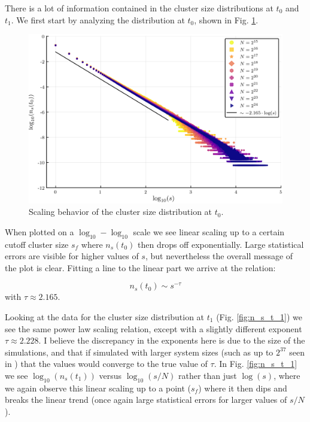There is a lot of information contained in the cluster size distributions at $t_0$ and $t_1$.
We first start by analyzing the distribution at $t_0$, shown in Fig. \ref{fig:n_s_t_0}.

\begin{figure}[H]
	\centering
	\includegraphics[width=350pt, clip]{images/n_s_t_0.png}
	\caption{Scaling behavior of the cluster size distribution at $t_0$.}
	\label{fig:n_s_t_0}
\end{figure}
When plotted on a $\log_{10}-\log_{10}$ scale we see linear scaling up to a certain cutoff cluster size $s_f$ where $n_s(t_0)$ then drops off exponentially.
Large statistical errors are visible for higher values of $s$, but nevertheless the overall message of the plot is clear.
Fitting a line to the linear part we arrive at the relation:

\begin{equation}
	n_s(t_0) \sim s^{-\tau}
\end{equation}
with $\tau \approx 2.165$.

Looking at the data for the cluster size distribution at $t_1$ (Fig. \ref{fig:n_s_t_1}) we see the same power law scaling relation, except with a slightly different exponent $\tau \approx 2.228$.
I believe the discrepancy in the exponents here is due to the size of the simulations, and that if simulated with larger system sizes (such as up to $2^{37}$ seen in \cite{Lee_1}) that the values would converge to the true value of $\tau$.
In Fig. \ref{fig:n_s_t_1} we see $\log_{10}(n_s(t_1))$ versus $\log_{10}(s/N)$ rather than just $\log(s)$, where we again observe this linear scaling up to a point ($s_f$) where it then dips and breaks the linear trend (once again large statistical errors for larger values of $s/N$).

